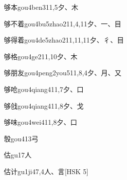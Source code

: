 \begin{EntryWithPhonetic}{够本}{gou4ben3}{11,5}{⼣、⽊}
\end{EntryWithPhonetic}

\begin{EntryWithPhonetic}{够不着}{gou4bu5zhao2}{11,4,11}{⼣、⼀、⽬}
\end{EntryWithPhonetic}

\begin{EntryWithPhonetic}{够得着}{gou4de5zhao2}{11,11,11}{⼣、⼻、⽬}
\end{EntryWithPhonetic}

\begin{EntryWithPhonetic}{够格}{gou4ge2}{11,10}{⼣、⽊}
\end{EntryWithPhonetic}

\begin{EntryWithPhonetic}{够朋友}{gou4peng2you5}{11,8,4}{⼣、⽉、⼜}
\end{EntryWithPhonetic}

\begin{EntryWithPhonetic}{够呛}{gou4qiang4}{11,7}{⼣、⼝}
\end{EntryWithPhonetic}

\begin{EntryWithPhonetic}{够戗}{gou4qiang4}{11,8}{⼣、⼽}
\end{EntryWithPhonetic}

\begin{EntryWithPhonetic}{够味}{gou4wei4}{11,8}{⼣、⼝}
\end{EntryWithPhonetic}

\begin{EntryWithPhonetic}{彀}{gou4}{13}{⼸}
\end{EntryWithPhonetic}

\begin{EntryWithPhonetic}{估}{gu1}{7}{⼈}
\end{EntryWithPhonetic}

\begin{EntryWithPhonetic}{估计}{gu1ji4}{7,4}{⼈、⾔}[HSK 5]
\end{EntryWithPhonetic}

